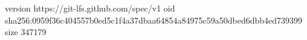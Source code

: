 version https://git-lfs.github.com/spec/v1
oid sha256:0959f36c404557b0ed5c1f4a37dbaa64854a84975c59a50dbed6dbb4ed739399
size 347179
